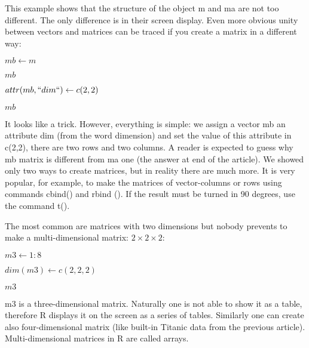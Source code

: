 \documentclass{beamer}
\begin{document}
\begin{frame}{}
This example shows that the structure of the object m and ma are not too different. The only difference is in their screen display. Even more obvious unity between vectors and matrices can be traced if you create a matrix in a different way:
\begin{center}

$mb \leftarrow m$

$mb$

$attr(mb, ``dim``) \leftarrow c(2,2)$

$mb$


\end{center}
\end{frame}

\begin{frame}{}
It looks like a trick. However, everything is simple: we assign a vector mb an attribute dim (from the word dimension) and set the value of this attribute in c(2,2), there are two rows and two columns. A reader is expected to guess why mb matrix is different from ma one (the answer at end of the article). 
We showed only two ways to create matrices, but in reality there are much more. It is very popular, for example, to make the matrices of vector-columns or rows using commands cbind() and rbind (). If the result must be turned in 90 degrees, use the command t().
\begin{center}

\end{center}
\end{frame}


\begin{frame}{}
The most common are matrices with two dimensions but nobody prevents to make a multi-dimensional matrix:
 \(2\times2\times2\):
\begin{center}

$m3 \leftarrow 1:8$

$dim(m3) \leftarrow c(2,2,2)$

$m3$

\end{center}
\end{frame}



\begin{frame}{}
m3 is a three-dimensional matrix. Naturally one is not able to show it as a table, therefore R displays it on the screen as a series of tables. Similarly one can create also four-dimensional matrix (like built-in Titanic data from the previous article). Multi-dimensional matrices in R are called arrays.
\end{frame}
\end{document}
